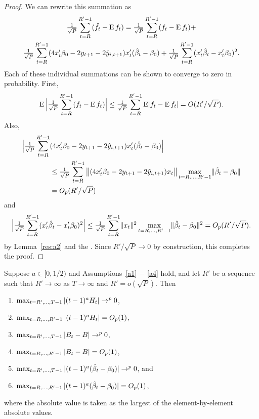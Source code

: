 \documentclass[12pt,fleqn]{article}
\providecommand\phantomsection{}
\begin{document}
\begin{proof}
  We can rewrite this summation as
  \begin{multline*}
    \ocltc{t} (\fh_t - \E f_t) = \ocltc{t} (f_t - \E f_t) + \\
    \ocltc{t} (4 x_t'\btrue - 2 y_{t+1} - 2 \yh_{i,t+1}) x_t'(\bh_t - \btrue)
    + \ocltc{t} (x_t'\bh_t - x_t'\btrue)^2.
  \end{multline*}
  Each of these individual summations can be shown to converge to
  zero in probability. First,
  \begin{equation*}
    \operatorname{E} \Big\lvert \tfrac{1}{\sqrt{P}} \sum_{t=R}^{R'-1} (f_t - \operatorname{E} f_t) \Big\rvert
    \leq \tfrac{1}{\sqrt{P}} \sum_{t=R}^{R'-1} \operatorname{E}\lvert f_t - \operatorname{E} f_t \rvert
    = O(R'/\sqrt{P}).
  \end{equation*}
  Also,
  \begin{align*}
    \Big\lvert \ocltc{t} & (4 x_t'\btrue - 2 y_{t+1} - 2 \yh_{i,t+1}) x_t'(\bh_t - \btrue) \Big\rvert \\
    &\leq \ocltc{t} \big\lVert (4 x_t'\btrue - 2 y_{t+1} - 2 \yh_{i,t+1}) x_t \big\rVert
    \omaxc{t} \lVert  \bh_t - \btrue \rVert \\
    & = O_p(R'/\sqrt{P})
  \end{align*}
  and
  \begin{equation*}
    \Big\lvert \ocltc{t} (x_t'\bh_t - x_t'\btrue)^2 \Big\rvert
    \leq \ocltc{t} \lVert x_t \rVert^2 \omaxc{t} \lVert \bh_t - \btrue \rVert^2
    = O_p(R'/\sqrt{P}).
  \end{equation*}
  by Lemma~\ref{res:a2} and the \lln. Since $R'/\sqrt{P} \to 0$ by
  construction, this completes the proof.
\end{proof}

\phantomsection
{}
\begin{alem}\label{res:a2}
  Suppose $a \in [0,1/2)$ and Assumptions~\ref{a1}~--~\ref{a4}
  hold, and let $R'$ be a sequence such that $R' \to \infty$ as $T \to
  \infty$ and $R' = o(\sqrt{P})$. Then
  \begin{enumerate}
  \item $\max_{t=R',\dots,T-1} | (t-1)^a H_t | \to^p 0$,
  \item $\max_{t=R,\dots,R'-1} | (t-1)^a H_t | = O_p(1)$,
  \item $\max_{t=R',\dots,T-1} | B_t - B | \to^p 0$,
  \item $\max_{t=R,\dots,R'-1} | B_t - B | = O_p(1)$,
  \item $\omaxb{t} | (t-1)^a(\bh_t - \btrue) | \to^{p} 0$, and
  \item $\omaxc{t} | (t-1)^a(\bh_t - \btrue) | = O_p(1)$,
  \end{enumerate}
  where the absolute value is taken as the largest of the
  element-by-element absolute values.
\end{alem}
\end{document}
